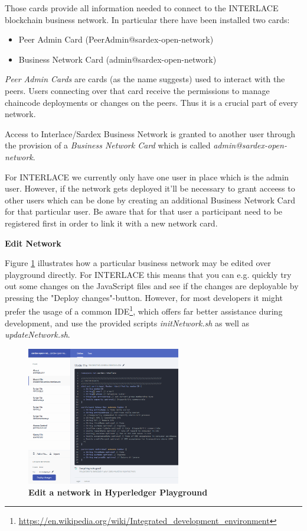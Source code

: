 Those cards provide all information needed to connect to the INTERLACE blockchain business network. In particular there have been installed two cards:

\begin{itemize}
	\item Peer Admin Card (PeerAdmin@sardex-open-network)
	\item Business Network Card (admin@sardex-open-network)
\end{itemize}

\textit{Peer Admin Cards} are cards (as the name suggests) used to interact with the peers. Users connecting over that card receive the permissions to manage chaincode deployments or changes on the peers. Thus it is a crucial part of every network.

Access to Interlace/Sardex Business Network is granted to another user through the provision of a \textit{Business Network Card} which is called \textit{admin@sardex-open-network}.

For INTERLACE we currently only have one user in place which is the admin user. However, if the network gets deployed it'll be necessary to grant acceess to other users which can be done by creating an additional Business Network Card for that particular user. Be aware that for that user a participant need to be registered first in order to link it with a new network card.

\textbf{Edit Network}

Figure \ref{fig:edit-network} illustrates how a particular business network may be edited over playground directly. For INTERLACE this means that you can e.g. quickly try out some changes on the JavaScript files and see if the changes are deployable by pressing the "Deploy changes"-button. However, for most developers it might prefer the usage of a common IDE\footnote{\url{https://en.wikipedia.org/wiki/Integrated_development_environment}}, which offers far better assistance during development, and use the provided scripts \textit{initNetwork.sh} as well as \textit{updateNetwork.sh}.

\begin{figure}[htbp]
  \centering
  \includegraphics[width=0.6\textwidth]{Figures/edit-network}
  \caption{\bf\small Edit a network in Hyperledger Playground}
  \label{fig:edit-network}
\end{figure}

